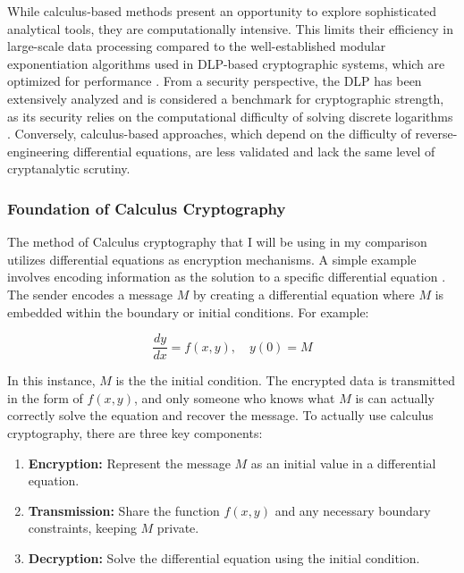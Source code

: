 \documentclass[12pt]{article}
\begin{document}
While calculus-based methods present an opportunity to explore sophisticated analytical tools, they are computationally intensive. This limits their efficiency in large-scale data processing compared to the well-established modular exponentiation algorithms used in DLP-based cryptographic systems, which are optimized for performance \cite{Koblitz1994}. From a security perspective, the DLP has been extensively analyzed and is considered a benchmark for cryptographic strength, as its security relies on the computational difficulty of solving discrete logarithms \cite{Trappe2006}. Conversely, calculus-based approaches, which depend on the difficulty of reverse-engineering differential equations, are less validated and lack the same level of cryptanalytic scrutiny.

\subsubsection*{Foundation of Calculus Cryptography}

The method of Calculus cryptography that I will be using in my comparison utilizes differential equations as encryption mechanisms. A simple example involves encoding information as the solution to a specific differential equation \cite{bhardwaj2014calculus}. The sender encodes a message \( M \) by creating a differential equation where \( M \) is embedded within the boundary or initial conditions. For example:

\[
\frac{dy}{dx} = f(x, y), \quad y(0) = M
\]

In this instance, \( M \) is the the initial condition. The encrypted data is transmitted in the form of \( f(x, y) \), and only someone who knows what \( M \) is can actually correctly solve the equation and recover the message. To actually use calculus cryptography, there are three key components:

\begin{enumerate}
    \item \textbf{Encryption:} Represent the message \( M \) as an initial value in a differential equation.
    \item \textbf{Transmission:} Share the function \( f(x, y) \) and any necessary boundary constraints, keeping \( M \) private.
    \item \textbf{Decryption:} Solve the differential equation using the initial condition.
\end{enumerate}
\end{document}
